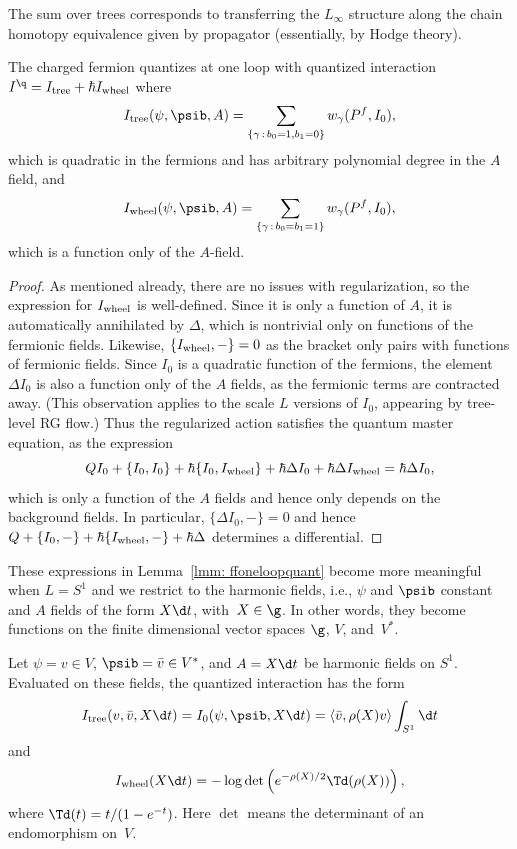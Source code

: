 \documentclass[10pt]{amsart}
\begin{document}
\begin{rmk}
The sum over trees corresponds to transferring the $L_\infty$ structure along the chain homotopy equivalence given by propagator 
(essentially, by Hodge theory).
\end{rmk} 

\begin{lmm}
\label{lmm: ffoneloopquant}
The charged fermion quantizes at one loop with quantized interaction $I^\q = I_{\rm tree} + \hbar I_{\rm wheel}$ 
where 
\[
I_{\rm tree}(\psi,\psib, A) = \sum_{\{\gamma \, : \, b_0 = 1, b_1=0\}} w_\gamma(P^f,I_0),
\]
which is quadratic in the fermions and has arbitrary polynomial degree in the $A$ field,
and
\[
I_{\rm wheel}(\psi,\psib, A) = \sum_{\{\gamma \, : \, b_0=b_1=1\}} w_\gamma(P^f,I_0),
\]
which is a function only of the $A$-field.
\end{lmm}

\begin{proof}
As mentioned already, there are no issues with regularization, 
so the expression for $I_{\rm wheel}$ is well-defined.
Since it is only a function of $A$, it is automatically annihilated by $\Delta$, 
which is nontrivial only on functions of the fermionic fields.
Likewise, $\{I_{\rm wheel},-\} = 0$ as the bracket only pairs with functions of fermionic fields.
Since $I_0$ is a quadratic function of the fermions,
the element $\Delta I_0$ is also a function only of the $A$ fields,
as the fermionic terms are contracted away.
(This observation applies to the scale $L$ versions of $I_0$, appearing by tree-level RG flow.)
Thus the regularized action satisfies the quantum master equation, 
as the expression 
\[
QI_0 + \{I_0,I_0\} + \hbar \{I_0, I_{\rm wheel}\} + \hbar \Delta I_0 + \hbar \Delta I_{\rm wheel} = \hbar \Delta I_0,
\]
which is only a function of the $A$ fields and hence only depends on the background fields.
In particular, $\{\Delta I_0,-\} = 0$ and hence $Q + \{I_0,-\} + \hbar \{I_{\rm wheel},-\} + \hbar \Delta$ determines a differential.
\end{proof}

These expressions in Lemma~\ref{lmm: ffoneloopquant} become more meaningful
when $L = S^1$ and we restrict to the harmonic fields,
i.e., $\psi$ and $\psib$ constant and $A$ fields of the form $X \d t$, with~$X\in\g$.
In other words, they become functions on the finite dimensional vector spaces $\g$, $V$, and~$V^*$.

\begin{lmm}\label{lmm: one loop term}
Let $\psi = v \in V$, $\psib = \bar{v} \in V^*$, and $A = X \d t$ be harmonic fields on $S^1$.
Evaluated on these fields, the quantized interaction has the form
\[
I_{\rm tree}(v,\bar{v},X \d t) = I_0(\psi,\psib,X \d t) = \langle \bar{v},\rho(X) v\rangle \int_{S^1} \d t
\]
and
\[
I_{\rm wheel}(X \d t)= -\log \det\left(e^{-\rho(X)/2} \Td(\rho(X))\right),
\]
where $\Td(t) = t/(1-e^{-t})$.
Here $\det$ means the determinant of an endomorphism on~$V$.
\end{lmm}
\end{document}
